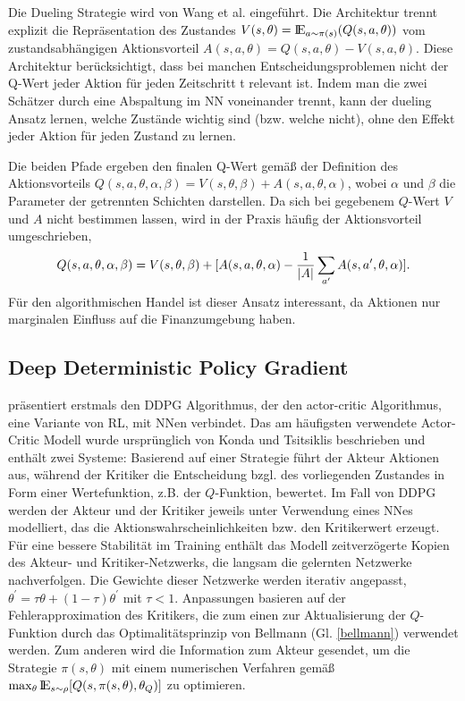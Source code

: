 Die Dueling Strategie wird von Wang et al. \parencite{duelwang} eingeführt.
Die Architektur trennt explizit die Repräsentation des Zustandes $V(s,\theta)=\mbox{I\negthinspace E}_{a\sim\pi(s)}(Q(s,a,\theta))$ vom zustandsabhängigen Aktionsvorteil $A(s,a,\theta)=Q(s,a,\theta)-V(s,a,\theta)$.
Diese Architektur berücksichtigt, dass bei manchen Entscheidungsproblemen nicht der Q-Wert jeder Aktion für jeden Zeitschritt t relevant ist.
Indem man die zwei Schätzer durch eine Abspaltung im \acs{NN} voneinander trennt, kann der dueling Ansatz lernen, welche Zustände wichtig sind (bzw. welche nicht), ohne den Effekt jeder Aktion für jeden Zustand zu lernen. 

Die beiden Pfade ergeben den finalen Q-Wert gemäß der Definition des Aktionsvorteils $Q(s,a,\theta,\alpha,\beta)=V(s,\theta,\beta)+A(s,a,\theta,\alpha)$, wobei $\alpha$ und $\beta$ die Parameter der getrennten Schichten darstellen. Da sich bei gegebenem $Q$-Wert $V$ und $A$ nicht bestimmen lassen, wird in der Praxis häufig der Aktionsvorteil umgeschrieben, 
\begin{align}
	Q(s,a,\theta,\alpha,\beta)=V(s,\theta,\beta)+[A(s,a,\theta,\alpha)-\frac{1}{|A|}\sum_{a^\prime}A(s,a^\prime,\theta,\alpha)]\textnormal{.}
\end{align}
Für den algorithmischen Handel ist dieser Ansatz interessant, da Aktionen nur marginalen Einfluss auf die Finanzumgebung haben.

\subsection{Deep Deterministic Policy Gradient}
\label{subsec:ddpg}

\parencite{lillicrap2019continuous} präsentiert erstmals den \acs{DDPG} Algorithmus, der den actor-critic Algorithmus, eine Variante von \acs{RL}, mit \acs{NN}en verbindet.
Das am häufigsten verwendete Actor-Critic Modell wurde ursprünglich von Konda und Tsitsiklis \parencite{konda} beschrieben und enthält zwei Systeme: Basierend auf einer Strategie führt der Akteur Aktionen aus, während der Kritiker die Entscheidung bzgl. des vorliegenden Zustandes in Form einer Wertefunktion, z.B. der $Q$-Funktion, bewertet. 
Im Fall von \acs{DDPG} werden der Akteur und der Kritiker jeweils unter Verwendung eines \acs{NN}es modelliert, das die Aktionswahrscheinlichkeiten bzw. den Kritikerwert erzeugt.
Für eine bessere Stabilität im Training enthält das Modell zeitverzögerte Kopien des Akteur- und Kritiker-Netzwerks, die langsam die gelernten Netzwerke nachverfolgen. Die Gewichte dieser Netzwerke werden iterativ angepasst, $\theta^\prime=\tau\theta+(1-\tau)\theta^\prime$ mit $\tau<1$.
Anpassungen basieren auf der Fehlerapproximation des Kritikers, die zum einen zur Aktualisierung der $Q$-Funktion durch das Optimalitätsprinzip von Bellmann (Gl. \ref{bellmann}) verwendet werden. Zum anderen wird die Information zum Akteur gesendet, um die Strategie $\pi(s,\theta)$ mit einem numerischen Verfahren gemäß $\max_\theta\mbox{I\negthinspace E}_{s\sim\rho}[Q(s,\pi(s,\theta),\theta_Q)]$ zu optimieren.
